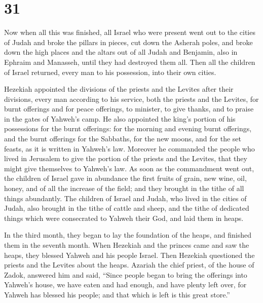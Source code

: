 \hypertarget{section-30}{%
\section{31}\label{section-30}}

 Now when all this was finished, all Israel who were
present went out to the cities of Judah and broke the pillars in pieces,
cut down the Asherah poles, and broke down the high places and the
altars out of all Judah and Benjamin, also in Ephraim and Manasseh,
until they had destroyed them all. Then all the children of Israel
returned, every man to his possession, into their own cities.

 Hezekiah appointed the divisions of the priests and the
Levites after their divisions, every man according to his service, both
the priests and the Levites, for burnt offerings and for peace
offerings, to minister, to give thanks, and to praise in the gates of
Yahweh's camp.  He also appointed the king's portion of
his possessions for the burnt offerings: for the morning and evening
burnt offerings, and the burnt offerings for the Sabbaths, for the new
moons, and for the set feasts, as it is written in Yahweh's law.
 Moreover he commanded the people who lived in Jerusalem
to give the portion of the priests and the Levites, that they might give
themselves to Yahweh's law.  As soon as the commandment
went out, the children of Israel gave in abundance the first fruits of
grain, new wine, oil, honey, and of all the increase of the field; and
they brought in the tithe of all things abundantly.  The
children of Israel and Judah, who lived in the cities of Judah, also
brought in the tithe of cattle and sheep, and the tithe of dedicated
things which were consecrated to Yahweh their God, and laid them in
heaps.

 In the third month, they began to lay the foundation of
the heaps, and finished them in the seventh month.  When
Hezekiah and the princes came and saw the heaps, they blessed Yahweh and
his people Israel.  Then Hezekiah questioned the priests
and the Levites about the heaps.  Azariah the chief
priest, of the house of Zadok, answered him and said, ``Since people
began to bring the offerings into Yahweh's house, we have eaten and had
enough, and have plenty left over, for Yahweh has blessed his people;
and that which is left is this great store.''

